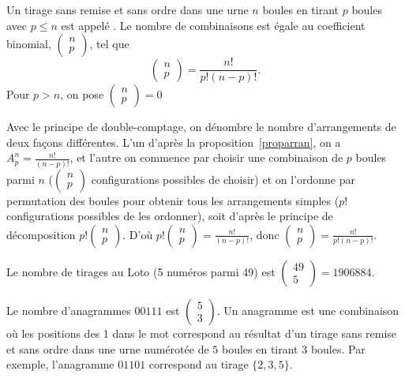 \documentclass{book}
\begin{document}
\begin{DefinitionProposition}[Combinaison]\label{propcomb} 
Un tirage sans remise et sans ordre dans une urne $n$ boules en tirant $p$ boules avec $p\leq n$  est appelé . Le nombre de combinaisons est égale au  coefficient binomial, $\begin{pmatrix}n\\p\end{pmatrix}$, tel que $$\begin{pmatrix}n\\p\end{pmatrix}=\frac{n!}{p!(n-p)!}.$$ 
Pour $p>n$, on pose $\begin{pmatrix}n\\p\end{pmatrix}=0$ 
\end{DefinitionProposition}
\begin{Demonstration}Avec le principe de double-comptage, on dénombre le nombre d'arrangements de deux façons différentes. L'un d'après la proposition~\ref{proparran}, on a $A_p^n=\frac{n!}{(n-p)!}$, et l'autre on commence par choisir une combinaison de $p$ boules parmi $n$ ($\begin{pmatrix}n\\p\end{pmatrix}$ configurations possibles
de choisir) et on l'ordonne par permutation des boules pour obtenir tous les
arrangements simples ($p!$ configurations possibles
de les ordonner), soit d'après le principe de décomposition $p!\begin{pmatrix}n\\p\end{pmatrix}$. D'où $p!\begin{pmatrix}n\\p\end{pmatrix}=\frac{n!}{(n-p)!}$, donc $\begin{pmatrix}n\\p\end{pmatrix}=\frac{n!}{p!(n-p)!}$.
\end{Demonstration}
\begin{Exemple} Le nombre de tirages au Loto (5 numéros parmi 49) est  $\begin{pmatrix}49\\5\end{pmatrix}=1 906 884$.
\end{Exemple}
\begin{Exemple} Le nombre d'anagrammes $00111$ est $\begin{pmatrix}5\\3\end{pmatrix}$. Un anagramme est une combinaison où les positions des 1 dans le mot correspond au résultat d'un tirage sans remise et sans ordre dans une urne numérotée de  $5$ boules en tirant $3$ boules. Par exemple, l'anagramme  $01101$ correspond au tirage $\{2,3,5\}$.
\end{Exemple}
\end{document}
